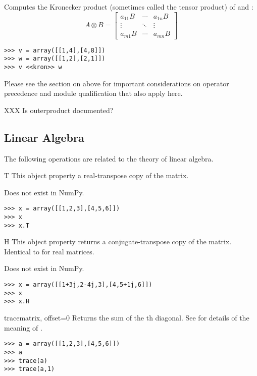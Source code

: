 \begin{itemize}
  Computes the Kronecker product 
  (sometimes called the tensor product) 
  of  and :
  \[%
    A \otimes B = 
    \begin{bmatrix} a_{11} B & \cdots & a_{1n}B \\ \vdots & 
    \ddots & \vdots \\ a_{m1} B & \cdots & a_{mn} B \end{bmatrix}
  \]

\begin{verbatim}
>>> v = array([[1,4],[4,8]])
>>> w = array([[1,2],[2,1]])
>>> v <<kron>> w
\end{verbatim}

  Please see the section on  above for important
  considerations on operator precedence and module qualification
  that also apply here.

\end{itemize}
XXX Is outerproduct documented?
\subsection{Linear Algebra}
The following operations are related to the theory of linear algebra.

\begin{memberdesc}[Matrix]{T}
  This object property a real-transpose copy of the matrix.

  Does not exist in NumPy.
\begin{verbatim}
>>> x = array([[1,2,3],[4,5,6]])
>>> x
>>> x.T
\end{verbatim}
\end{memberdesc}

\begin{memberdesc}[Matrix]{H}
  This object property returns a conjugate-transpose copy of the matrix.
  Identical to  for real matrices.

  Does not exist in NumPy.
\begin{verbatim}
>>> x = array([[1+3j,2-4j,3],[4,5+1j,6]])
>>> x
>>> x.H
\end{verbatim}
\end{memberdesc}

\begin{funcdesc}{trace}{matrix, offset=0}
  Returns the sum of the th diagonal. See 
  for details of the meaning of .
\begin{verbatim}
>>> a = array([[1,2,3],[4,5,6]])
>>> a
>>> trace(a)
>>> trace(a,1)
\end{verbatim}
\end{funcdesc}

